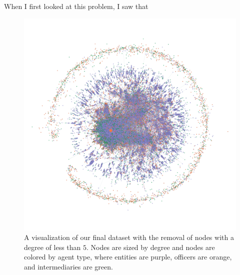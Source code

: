 \documentclass[11pt]{article}
\begin{document}
When I first looked at this problem, I saw that
\begin{figure}[h!]
    \centering
    \includegraphics[width = 5in]{figures/figure1.png}
    \caption{A visualization of our final dataset with the removal of
            nodes with a degree of less than $5.$ Nodes are sized by
            degree and nodes are colored by agent type, where entities are
            purple, officers are orange, and intermediaries are green.}
\end{figure}
\end{document}
